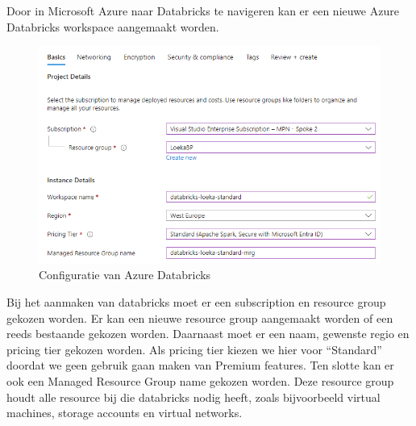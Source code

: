 Door in Microsoft Azure naar Databricks te navigeren kan er een nieuwe Azure Databricks workspace aangemaakt worden.

\begin{figure}[H]
    \centering
    \includegraphics[width=1\textwidth]{./graphics/databricks/initial_2.png}
    \caption{Configuratie van Azure Databricks}
    \label{fig:conf-databricks}
\end{figure}

Bij het aanmaken van databricks moet er een subscription en resource group gekozen worden. Er kan een nieuwe resource group aangemaakt worden of een reeds bestaande gekozen worden. Daarnaast moet er een naam, gewenste regio en pricing tier gekozen worden. Als pricing tier kiezen we hier voor ``Standard'' doordat we geen gebruik gaan maken van Premium features. Ten slotte kan er ook een Managed Resource Group name gekozen worden. Deze resource group houdt alle resource bij die databricks nodig heeft, zoals bijvoorbeeld virtual machines, storage accounts en virtual networks.

